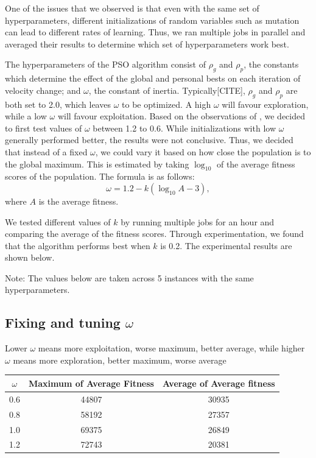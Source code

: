 \documentclass{article}
\begin{document}
One of the issues that we observed is that even with the same set of
hyperparameters, different initializations of random variables such as mutation
can lead to different rates of learning. Thus, we ran multiple jobs in parallel
and averaged their results to determine which set of hyperparameters work best.

The hyperparameters of the PSO algorithm consist of $\rho_g$ and $\rho_p$, the
constants which determine the effect of the global and personal bests on each
iteration of velocity change; and $\omega$, the constant of inertia.
Typically[CITE], $\rho_g$ and $\rho_p$ are both set to 2.0, which leaves
$\omega$ to be optimized. A high $\omega$ will favour exploration, while a low
$\omega$ will favour exploitation. Based on the observations of
\cite{shi1998parameter}, we decided to first test values of $\omega$ between
1.2 to 0.6.  While initializations with low $\omega$ generally performed
better, the results were not conclusive. Thus, we decided that instead of a
fixed $\omega$, we could vary it based on how close the population is to the
global maximum. This is estimated by taking $\log_{10}$ of the average fitness
scores of the population. The formula is as follows: \[ \omega = 1.2 -
k(\log_{10}A - 3), \] where $A$ is the average fitness.

We tested different values of $k$ by running multiple jobs for an hour and
comparing the average of the fitness scores. Through experimentation, we found
that the algorithm performs best when $k$ is 0.2. The experimental results are
shown below.

Note: The values below are taken across 5 instances with the same hyperparameters.

\subsection{Fixing and tuning $\omega$}
Lower $\omega$ means more exploitation, worse maximum, better average, while
higher $\omega$ means more exploration, better maximum, worse average

\begin{center}
\begin{tabular}{ | c | c | c | }
	\hline
	$\omega$ & Maximum of Average Fitness & Average of Average fitness \\ \hline
	0.6 & 44807 & 30935 \\ \hline
	0.8 & 58192 & 27357 \\ \hline
	1.0 & 69375 & 26849 \\ \hline
	1.2 & 72743 & 20381 \\ \hline
\end{tabular}
\end{center}
\end{document}
